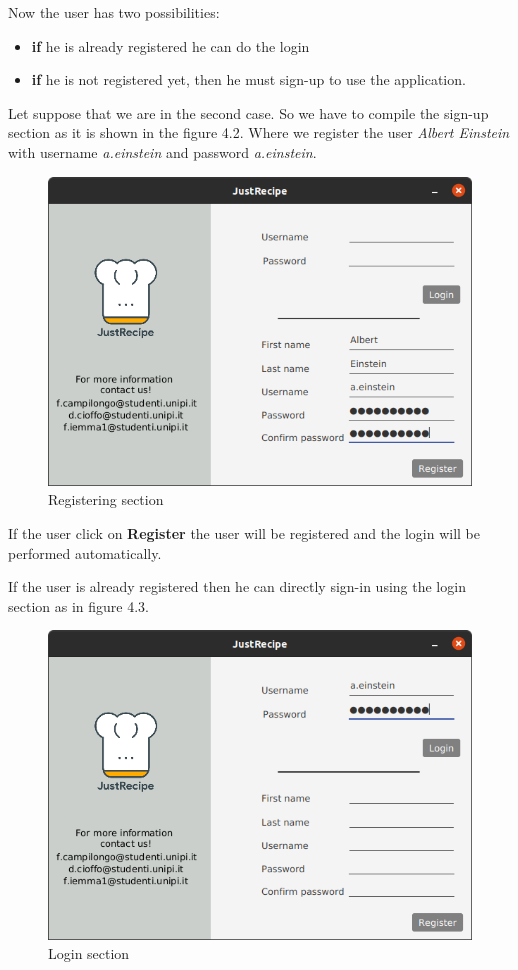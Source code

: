 \documentclass[a4paper]{report}
\begin{document}
\noindent Now the user has two possibilities:
\begin{itemize}
	\item \textbf{if} he is already registered he can do the login
	\item \textbf{if} he is not registered yet, then he must sign-up to use the application.
\end{itemize}

\noindent Let suppose that we are in the second case. So we have to compile the sign-up section as it is shown in the figure 4.2. Where we register the user \emph{Albert Einstein} with username \emph{a.einstein} and password \emph{a.einstein}. 

\begin{figure}[htpb]
	\centering
	\includegraphics[scale=0.3]{img/user_manual/register.png}
	\caption{Registering section}
\end{figure}

\noindent If the user click on \textbf{Register} the user will be registered and the login will be performed automatically.

\noindent If the user is already registered then he can directly sign-in using the login section as in figure 4.3.

\begin{figure}[htpb]
	\centering
	\includegraphics[scale=0.3]{img/user_manual/loginsection.png}
	\caption{Login section}
\end{figure}
\end{document}

